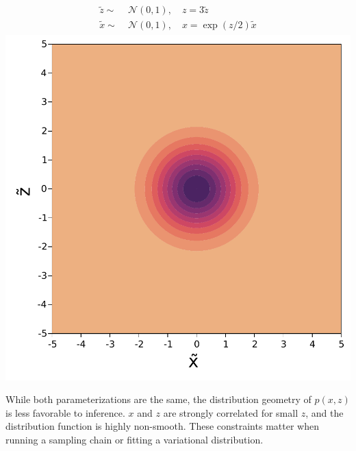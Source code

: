\begin{minipage}{0.5\textwidth}
    \centering
    \begin{align}
        \begin{aligned}
            \tilde{z} \sim&\; \mathcal{N}(0, 1),\quad z = 3\tilde{z}\\
            \tilde{x} \sim&\; \mathcal{N}(0, 1),\quad x = \exp(z/2)\tilde{x}
        \end{aligned}
    \end{align}
    \includegraphics[width=\textwidth]{./chapters/1_introduction/figures/neals_funnel_non_centered.pdf}
    \label{fig:neals_noncentered}
\end{minipage}
\vspace{0.5cm}

While both parameterizations are the same, the distribution geometry of $p(x,z)$ is less favorable to inference.
$x$ and $z$ are strongly correlated for small $z$, and the distribution function is highly non-smooth.
These constraints matter when running a sampling chain or fitting a variational distribution.

